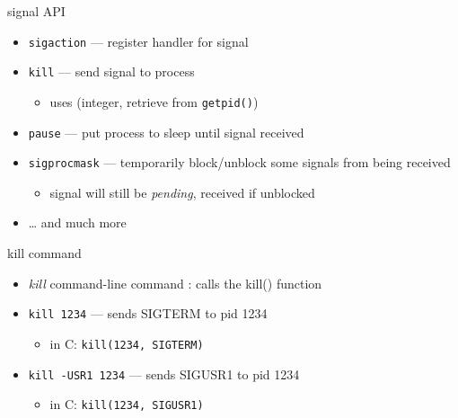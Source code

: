 
\begin{frame}{signal API}
\begin{itemize}
    \item {\tt sigaction} --- register handler for signal
    \item {\tt kill} --- send signal to process
        \begin{itemize}
        \item uses  (integer, retrieve from \texttt{getpid()})
        \end{itemize}
    \item {\tt pause} --- put process to sleep until signal received
    \item {\tt sigprocmask} --- temporarily block/unblock some signals from being received
        \begin{itemize}
        \item signal will still be \textit{pending}, received if unblocked
        \end{itemize}
    \item \ldots{} and much more
\end{itemize}
\end{frame}

\begin{frame}{kill command}
    \begin{itemize}
    \item \textit{kill} command-line command : calls the kill() function
    \item \texttt{kill 1234} --- sends SIGTERM to pid 1234
        \begin{itemize}
        \item in C: \texttt{kill(1234, SIGTERM)}
        \end{itemize}
    \item \texttt{kill -USR1 1234} --- sends SIGUSR1 to pid 1234
        \begin{itemize}
        \item in C: \texttt{kill(1234, SIGUSR1)}
        \end{itemize}
    \end{itemize}
\end{frame}
